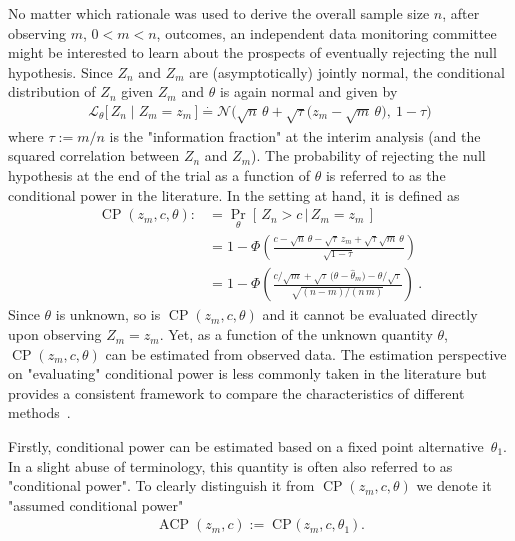 \documentclass[12pt]{article}
\renewcommand{\Pr}{\operatorname{Pr}}
\newcommand{\CP}{\ensuremath{\operatorname{CP}}}
\newcommand{\ACP}{\ensuremath{\operatorname{ACP}}}
\renewcommand{\Pr}{\ensuremath{\operatorname{Pr}}}
\newcommand{\cond}{\ensuremath{\,|\,}}
\begin{document}
No matter which rationale was used to derive the overall sample size $n$,
after observing $m$, $0<m<n$, outcomes,
an independent data monitoring committee might be interested to learn about the prospects of
eventually rejecting the null hypothesis.
Since $Z_n$ and $Z_m$ are (asymptotically) jointly normal, the conditional distribution of $Z_n$ given $Z_m$ and $\theta$ is again normal and
given by
\begin{align}
    \mathcal{L}_\theta\big[\, Z_n \mid Z_m = z_m \,\big] \stackrel{\cdot}{=} \mathcal{N}\Big(\sqrt{n}\,\theta + \sqrt{\tau}\big(z_{m} - \sqrt{m}\,\theta\big),\ 1 - \tau\Big) \label{eq:joint-distribution}
\end{align}
where $\tau:=m/n$ is the "information fraction" at the interim analysis (and the squared correlation between $Z_n$ and $Z_m$).
The probability of rejecting the null hypothesis at the end of the trial
as a function of $\theta$ is referred to as the conditional power in the literature.
In the setting at hand, it is defined as
\begin{align}
    \CP(z_m, c, \theta) :&= \Pr_\theta[\,Z_n > c \cond Z_m = z_m\,] \\
        &= 1 - \Phi\left(
            \frac{c - \sqrt{n}\,\theta - \sqrt{\tau} \, z_m + \sqrt{\tau}\sqrt{m}\,\theta
            }{\sqrt{1 - \tau}}
        \right) \\
        &= 1 - \Phi\left(
            \frac{c/\sqrt{m} + \sqrt{\tau}\,\big(\theta - \widehat{\theta}_m\big) - \theta/\sqrt{\tau}
            }{\sqrt{(n - m)/(n\,m)}}
        \right)      \ .
\end{align}
Since $\theta$ is unknown,
so is $\CP(z_m, c, \theta)$ and it cannot be
evaluated directly upon observing $Z_m=z_m$.
Yet, as a function of the unknown quantity $\theta$,
$\CP(z_m, c, \theta)$ can be estimated from observed data.
The estimation perspective on "evaluating" conditional power is
less commonly taken in the literature but provides a consistent framework to
compare the characteristics of different methods~\cite{bauer2006}.

Firstly, conditional power can be estimated based on a fixed point alternative~$\theta_1$.
In a slight abuse of terminology,
this quantity is often also referred to as "conditional power".
To clearly distinguish it from $\CP(z_m, c, \theta)$ we denote
it "assumed conditional power"
\begin{align}
    \ACP(z_m,c) := \CP\big(\, z_m, c, \theta_1 \,\big) \ .
\end{align}
\end{document}
